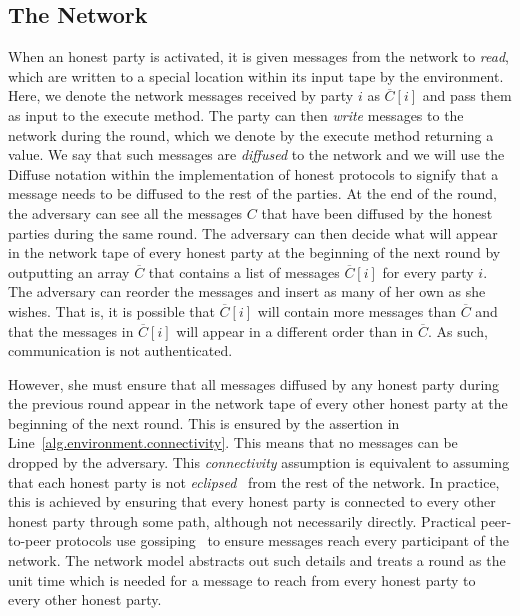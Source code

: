 \subsection{The Network}

When an honest party is activated, it is given messages from the network to
\emph{read}, which are written to a special location within its input tape by
the environment. Here, we denote the network messages received by party $i$ as
$\overline{C}[i]$ and pass them as input to the \textsf{execute} method. The
party can then \emph{write} messages to the network during the round, which we
denote by the \textsf{execute} method returning a value. We say that such
messages are \emph{diffused} to the network and we will use
the \textsf{Diffuse} notation within the implementation of honest protocols to
signify that a message needs to be diffused to the rest of the parties. At the end of the
round, the adversary can see all the messages $C$ that have been diffused by the
honest parties during the same round. The adversary can then decide what will
appear in the network tape of every honest party at the beginning of the next
round by outputting an array $\overline{C}$ that contains a list of messages
$\overline{C}[i]$ for every party $i$. The adversary can reorder the messages and
insert as many of her own as she wishes. That is, it is possible that
$\overline{C}[i]$ will contain more messages than $\overline{C}$ and that the
messages in $\overline{C}[i]$ will appear in a different order than in
$\overline{C}$. As such, communication is not authenticated.

However, she must ensure that all messages diffused by any honest party
during the previous round appear in the network tape of every other honest party
at the beginning of the next round. This is ensured by the assertion in Line~\ref{alg.environment.connectivity}. This means that no messages can be dropped
by the adversary. This \emph{connectivity} assumption is equivalent to assuming
that each honest party is not \emph{eclipsed}~\cite{eclipse,eclipse-ethereum}
from the rest of the network. In practice, this is achieved by ensuring that
every honest party is connected to every other honest party through some path,
although not necessarily directly. Practical peer-to-peer protocols use
gossiping~\cite{gossip} to ensure messages reach every participant of the network. The network
model abstracts out such details and treats a round as the unit time which is
needed for a message to reach from every honest party to every other honest
party.

